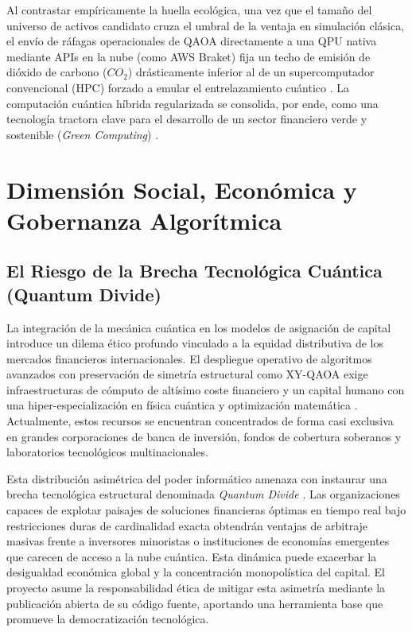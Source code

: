 Al contrastar empíricamente la huella ecológica, una vez que el tamaño del universo de activos candidato cruza el umbral de la ventaja en simulación clásica, el envío de ráfagas operacionales de QAOA directamente a una QPU nativa mediante APIs en la nube (como AWS Braket) fija un techo de emisión de dióxido de carbono ($CO_2$) drásticamente inferior al de un supercomputador convencional (HPC) forzado a emular el entrelazamiento cuántico \cite{GreenQuantum2023}. La computación cuántica híbrida regularizada se consolida, por ende, como una tecnología tractora clave para el desarrollo de un sector financiero verde y sostenible (\textit{Green Computing}) \cite{GreenQuantum2023}.

\section{Dimensión Social, Económica y Gobernanza Algorítmica}
\label{sec:dimension_social_gobernanza}

\subsection{El Riesgo de la Brecha Tecnológica Cuántica (Quantum Divide)}
La integración de la mecánica cuántica en los modelos de asignación de capital introduce un dilema ético profundo vinculado a la equidad distributiva de los mercados financieros internacionales. El despliegue operativo de algoritmos avanzados con preservación de simetría estructural como XY-QAOA exige infraestructuras de cómputo de altísimo coste financiero y un capital humano con una hiper-especialización en física cuántica y optimización matemática \cite{PMBOK2021}. Actualmente, estos recursos se encuentran concentrados de forma casi exclusiva en grandes corporaciones de banca de inversión, fondos de cobertura soberanos y laboratorios tecnológicos multinacionales.

Esta distribución asimétrica del poder informático amenaza con instaurar una brecha tecnológica estructural denominada \textit{Quantum Divide} \cite{NisqSociety2022}. Las organizaciones capaces de explotar paisajes de soluciones financieras óptimas en tiempo real bajo restricciones duras de cardinalidad exacta obtendrán ventajas de arbitraje masivas frente a inversores minoristas o instituciones de economías emergentes que carecen de acceso a la nube cuántica. Esta dinámica puede exacerbar la desigualdad económica global y la concentración monopolística del capital. El proyecto asume la responsabilidad ética de mitigar esta asimetría mediante la publicación abierta de su código fuente, aportando una herramienta base que promueve la democratización tecnológica.

